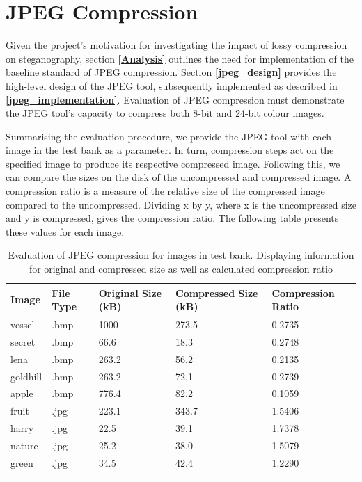 \documentclass{l4proj}
\begin{document}
\section{JPEG Compression}\label{jpeg_compression}

Given the project's motivation for investigating the impact of lossy compression on steganography, section \textbf{\ref{Analysis}} outlines the need for implementation of the baseline standard of JPEG compression. Section \textbf{\ref{jpeg_design}} provides the high-level design of the JPEG tool, subsequently implemented as described in \textbf{\ref{jpeg_implementation}}. Evaluation of JPEG compression must demonstrate the JPEG tool's capacity to compress both 8-bit and 24-bit colour images.

Summarising the evaluation procedure, we provide the JPEG tool with each image in the test bank as a parameter. In turn, compression steps act on the specified image to produce its respective compressed image. Following this, we can compare the sizes on the disk of the uncompressed and compressed image. A compression ratio is a measure of the relative size of the compressed image compared to the uncompressed. Dividing x by y, where x is the uncompressed size and y is compressed, gives the compression ratio. The following table presents these values for each image.

\begin{table}[]
\centering
\caption{Evaluation of JPEG compression for images in test bank. Displaying information for original and compressed size as well as calculated compression ratio}
\label{table:jpeg_compression}
\begin{tabular}{@{}lllll@{}}
\toprule
Image    & File Type       & Original Size (kB) & Compressed Size (kB) & Compression Ratio \\\midrule
vessel   & .bmp            & 1000               & 273.5                & 0.2735            \\
secret   & .bmp            & 66.6               & 18.3                 & 0.2748            \\
lena     & .bmp            & 263.2              & 56.2                 & 0.2135            \\
goldhill & .bmp            & 263.2              & 72.1                 & 0.2739            \\
apple    & .bmp            & 776.4              & 82.2                 & 0.1059            \\
fruit    & .jpg            & 223.1              & 343.7                & 1.5406            \\
harry    & .jpg            & 22.5               & 39.1                 & 1.7378            \\
nature   & .jpg            & 25.2               & 38.0                 & 1.5079            \\
green    & .jpg            & 34.5               & 42.4                 & 1.2290            \\\bottomrule
         &                 &                    &                      &                  
\end{tabular}
\end{table}
\end{document}
